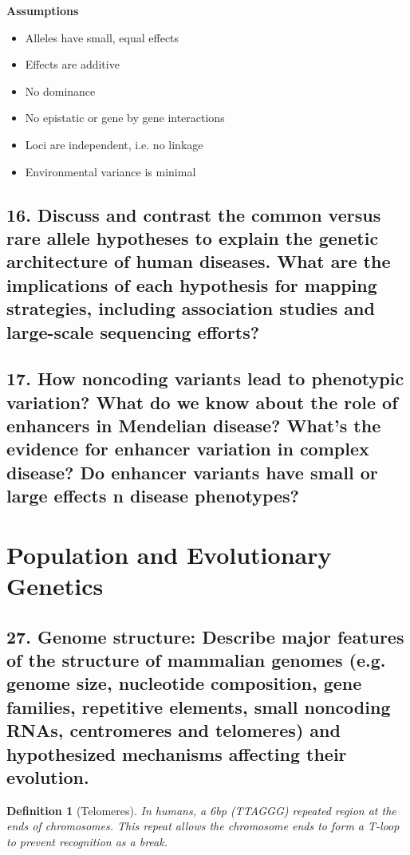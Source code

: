 \documentclass{tufte-handout}
\theoremstyle{noparens}
\newtheorem*{define}{Definition}
\begin{document}
\textbf{Assumptions}

\begin{itemize}
\item Alleles have small, equal effects
\item Effects are additive
\item No dominance
\item No epistatic or gene by gene interactions
\item Loci are independent, i.e. no linkage
\item Environmental variance is minimal
\end{itemize}

\newpage
\subsection{16. Discuss and contrast the common versus rare allele hypotheses to explain the genetic architecture of human diseases. What are the implications of each hypothesis for mapping strategies, including association studies and large-scale sequencing efforts?}

\newpage 
\subsection{17. How noncoding variants lead to phenotypic variation? What do we know about the role of enhancers in Mendelian disease? What's the evidence for enhancer variation in complex disease? Do enhancer variants have small or large effects n disease phenotypes?}

\newpage
\section{Population and Evolutionary Genetics}\label{sec:popgen}

\subsection{27.
Genome structure: Describe major features of the structure of mammalian genomes (e.g. 
genome size, nucleotide composition, gene families, repetitive elements, small noncoding RNAs, centromeres and telomeres) and hypothesized mechanisms affecting their evolution.}

\begin{define}[Telomeres]
In humans, a 6bp (TTAGGG) repeated region at the ends of chromosomes. This repeat allows the chromosome ends to form a T-loop to prevent recognition as a break.
\end{define}
\end{document}
